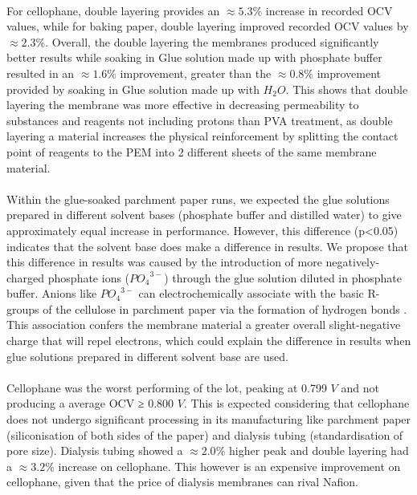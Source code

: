 \documentclass[12pt, twocolumn, a4paper]{article}
\begin{document}
    \paragraph{}For cellophane, double layering provides an $\approx5.3\%$ increase in recorded OCV values, while for baking paper, double layering improved recorded OCV values by $\approx2.3\%$. Overall, the double layering the membranes produced significantly better results while soaking in Glue solution made up with phosphate buffer resulted in an $\approx1.6\%$ improvement, greater than the $\approx0.8\%$ improvement provided by soaking in Glue solution made up with $H_{2}O$. This shows that double layering the membrane was more effective in decreasing permeability to substances and reagents not including protons than PVA treatment, as double layering a material increases the physical reinforcement by splitting the contact point of reagents to the PEM into 2 different sheets of the same membrane material. 
    \paragraph{}Within the glue-soaked parchment paper runs, we expected the glue solutions prepared in different solvent bases (phosphate buffer and distilled water) to give approximately equal increase in performance. However, this difference (p<0.05) indicates that the solvent base does make a difference in results. We propose that this difference in results was caused by the introduction of more negatively-charged phosphate ions (${PO_{4}}^{3-}$) through the glue solution diluted in phosphate buffer. Anions like ${PO_{4}}^{3-}$ can electrochemically associate with the basic R-groups of the cellulose in parchment paper via the formation of hydrogen bonds \cite{PBIthing}. This association confers the membrane material a greater overall slight-negative charge that will repel electrons, which could explain the difference in results when glue solutions prepared in different solvent base are used. 

    \paragraph{}Cellophane was the worst performing of the lot, peaking at 0.799 $V$ and not producing a average OCV ≥ 0.800 $V$. This is expected considering that cellophane does not undergo significant processing in its manufacturing like parchment paper (siliconisation of both sides of the paper) and dialysis tubing (standardisation of pore size). Dialysis tubing showed a $\approx2.0\%$ higher peak and double layering had a $\approx3.2\%$ increase on cellophane. This however is an expensive improvement on cellophane, given that the price of dialysis membranes can rival Nafion\texttrademark{}.
    
\end{document}
